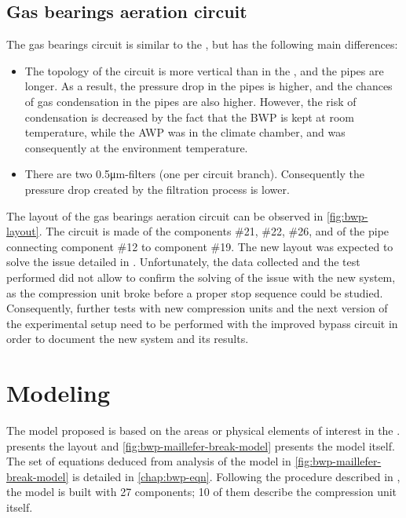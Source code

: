 \subsection{Gas bearings aeration circuit}
\label{sec:bwp-aeration}

The \BWP{} gas bearings circuit  is similar to the \AWP{}, but
has the following main differences:

\begin{itemize}
\item The topology of the circuit is more vertical than in the \AWP{},
  and the pipes are longer. As a result, the pressure drop in the
  pipes is higher, and the chances of gas condensation in the pipes
  are also higher. However, the risk of condensation is decreased by
  the fact that the BWP is kept at room temperature, while the AWP was
  in the climate chamber, and was consequently at the environment
  temperature.
\item There are two 0.5\si{\micro\meter}-filters (one per circuit
  branch). Consequently the pressure drop created by the filtration
  process is lower.
\end{itemize}

The layout of the gas bearings aeration circuit can be observed in
\cref{fig:bwp-layout}. The circuit is made of the components \#21,
\#22, \#26, and of the pipe connecting component \#12 to component
\#19. The new layout was expected to solve the issue detailed in
. Unfortunately, the data collected and the
test performed did not allow to confirm the solving of the issue
with the new system, as the compression unit broke before a proper
stop sequence could be studied. Consequently, further tests with new
compression units and the next version of the experimental setup need
to be performed with the improved bypass circuit in order to document
the new system and its results.

\section{Modeling}
\label{sec:bwp-model}

The model proposed is based on the areas or physical elements of
interest in the \BWP{}.  presents the \BWP{}
layout and \cref{fig:bwp-maillefer-break-model} presents the model
itself. The set of equations deduced from analysis of the model in
\cref{fig:bwp-maillefer-break-model} is detailed in
\cref{chap:bwp-eqn}. Following the procedure described in
, the model is built with 27 components; 10
of them describe the compression unit itself.

